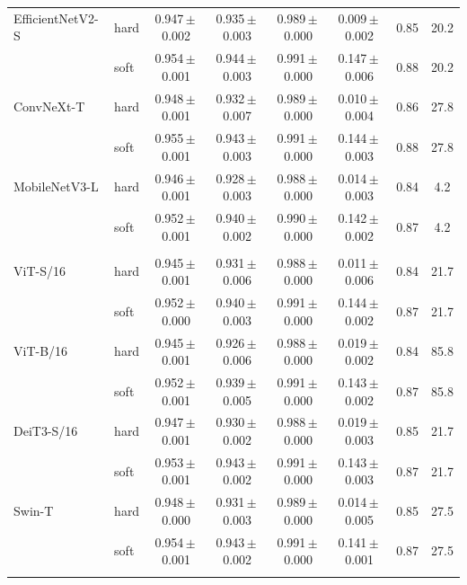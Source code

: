 \begin{table}[!htbp]
{\begin{tabular}{llcccccc}
EfficientNetV2-S & hard & 0.947\,$\pm$\,0.002 & 0.935\,$\pm$\,0.003 & 0.989\,$\pm$\,0.000 & 0.009\,$\pm$\,0.002 & 0.85 & 20.2 \\
 & soft & 0.954\,$\pm$\,0.001 & 0.944\,$\pm$\,0.003 & 0.991\,$\pm$\,0.000 & 0.147\,$\pm$\,0.006 & 0.88 & 20.2 \\
ConvNeXt-T & hard & 0.948\,$\pm$\,0.001 & 0.932\,$\pm$\,0.007 & 0.989\,$\pm$\,0.000 & 0.010\,$\pm$\,0.004 & 0.86 & 27.8 \\
 & soft & 0.955\,$\pm$\,0.001 & 0.943\,$\pm$\,0.003 & 0.991\,$\pm$\,0.000 & 0.144\,$\pm$\,0.003 & 0.88 & 27.8 \\
MobileNetV3-L & hard & 0.946\,$\pm$\,0.001 & 0.928\,$\pm$\,0.003 & 0.988\,$\pm$\,0.000 & 0.014\,$\pm$\,0.003 & 0.84 & 4.2 \\
 & soft & 0.952\,$\pm$\,0.001 & 0.940\,$\pm$\,0.002 & 0.990\,$\pm$\,0.000 & 0.142\,$\pm$\,0.002 & 0.87 & 4.2 \\
\addlinespace
\multicolumn{8}{l}{\textit{Transformer}} \\
ViT-S/16 & hard & 0.945\,$\pm$\,0.001 & 0.931\,$\pm$\,0.006 & 0.988\,$\pm$\,0.000 & 0.011\,$\pm$\,0.006 & 0.84 & 21.7 \\
 & soft & 0.952\,$\pm$\,0.000 & 0.940\,$\pm$\,0.003 & 0.991\,$\pm$\,0.000 & 0.144\,$\pm$\,0.002 & 0.87 & 21.7 \\
ViT-B/16 & hard & 0.945\,$\pm$\,0.001 & 0.926\,$\pm$\,0.006 & 0.988\,$\pm$\,0.000 & 0.019\,$\pm$\,0.002 & 0.84 & 85.8 \\
 & soft & 0.952\,$\pm$\,0.001 & 0.939\,$\pm$\,0.005 & 0.991\,$\pm$\,0.000 & 0.143\,$\pm$\,0.002 & 0.87 & 85.8 \\
DeiT3-S/16 & hard & 0.947\,$\pm$\,0.001 & 0.930\,$\pm$\,0.002 & 0.988\,$\pm$\,0.000 & 0.019\,$\pm$\,0.003 & 0.85 & 21.7 \\
 & soft & 0.953\,$\pm$\,0.001 & 0.943\,$\pm$\,0.002 & 0.991\,$\pm$\,0.000 & 0.143\,$\pm$\,0.003 & 0.87 & 21.7 \\
Swin-T & hard & 0.948\,$\pm$\,0.000 & 0.931\,$\pm$\,0.003 & 0.989\,$\pm$\,0.000 & 0.014\,$\pm$\,0.005 & 0.85 & 27.5 \\
 & soft & 0.954\,$\pm$\,0.001 & 0.943\,$\pm$\,0.002 & 0.991\,$\pm$\,0.000 & 0.141\,$\pm$\,0.001 & 0.87 & 27.5 \\
\addlinespace
\bottomrule
\end{tabular}}
\end{table}
